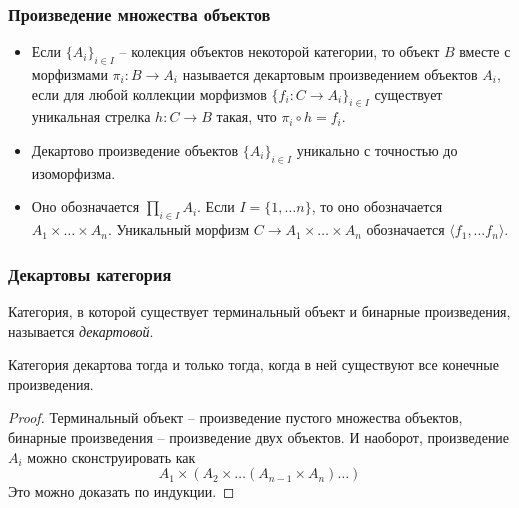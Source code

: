 \documentclass{beamer}
\theoremstyle{definition}
\begin{document}
\begin{frame}
\frametitle{Произведение множества объектов}
\begin{itemize}
\item Если $\{ A_i \}_{i \in I}$ -- колекция объектов некоторой категории, то объект $B$ вместе с морфизмами $\pi_i : B \to A_i$ называется декартовым произведением объектов $A_i$, если для любой коллекции морфизмов $\{ f_i : C \to A_i \}_{i \in I}$ существует уникальная стрелка $h : C \to B$ такая, что $\pi_i \circ h = f_i$.
\item Декартово произведение объектов $\{ A_i \}_{i \in I}$ уникально с точностью до изоморфизма.
\item Оно обозначается $\prod\limits_{i \in I} A_i$.
Если $I = \{ 1, \ldots n \}$, то оно обозначается $A_1 \times \ldots \times A_n$.
Уникальный морфизм $C \to A_1 \times \ldots \times A_n$ обозначается $\langle f_1, \ldots f_n \rangle$.
\end{itemize}
\end{frame}

\begin{frame}
\frametitle{Декартовы категория}
Категория, в которой существует терминальный объект и бинарные произведения, называется \emph{декартовой}.

\begin{prop}
Категория декартова тогда и только тогда, когда в ней существуют все конечные произведения.
\end{prop}
\begin{proof}
Терминальный объект -- произведение пустого множества объектов, бинарные произведения -- произведение двух объектов.
И наоборот, произведение $A_i$ можно сконструировать как
\[ A_1 \times (A_2 \times \ldots (A_{n-1} \times A_n) \ldots) \]
Это можно доказать по индукции.
\end{proof}
\end{frame}
\end{document}
